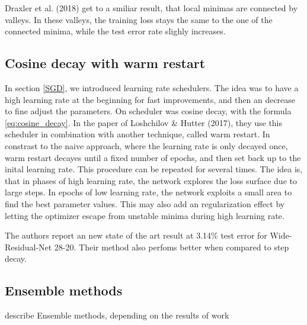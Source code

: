 Draxler et al. (2018) get to a smiliar result, that local minimas are connected by
valleys. In these valleys, the training loss stays the same to the one of the
connected minima, while the test error rate slighly increases.


\subsection{Cosine decay with warm restart}\label{cosine_decay}

In section \ref{SGD}, we introduced learning rate schedulers. The idea was to
have a high learning rate at the beginning for fast improvements, and then an
decrease to fine adjust the parameters. On scheduler was cosine decay, with the
formula \ref{eq:cosine_decay}. In the paper of Loshchilov \& Hutter (2017), they
use this scheduler in combination with another technique, called warm restart.
In constrast to the naive approach, where the learning rate is only decayed
once, warm restart decayes until a fixed number of epochs, and then set back up
to the inital learning rate. This procedure can be repeated for several times.
The idea is, that in phases of high learning rate, the network explores the loss
surface due to large steps. In epochs of low learning rate, the network exploits
a small area to find the best parameter values. This may also add an
regularization effect by letting the optimizer escape from unstable minima
during high learning rate.

The authors report an new state of the art result at 3.14\% test error for
Wide-Residual-Net 28-20. Their method also perfoms better when compared to step
decay.
\subsection{Ensemble methods}
describe Ensemble methods, depending on the results of work